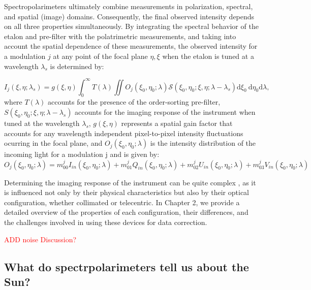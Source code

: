 Spectropolarimeters ultimately combine measurements in polarization, spectral, and spatial (image) domains. Consequently, the final observed intensity depends on all three properties simultaneously. By integrating the spectral behavior of the etalon and pre-filter with the polatrimetric measurements, and taking into account the spatial dependence of these measurements, the observed intensity for a modulation $j$ at any point of the focal plane $\eta, \xi$ when the etalon is tuned at a wavelength $\lambda _ s$ is determined by:

\begin{equation}
  I_ j\left(\xi, \eta ; \lambda_{s}\right)=g(\xi, \eta)\int_{0}^{\infty} T(\lambda) \iint  O _ j\left(\xi_0, \eta_0 ; \lambda\right)  \mathcal{S}\left(\xi_0, \eta_0; \xi , \eta; \lambda-\lambda_{s}\right)  \mathrm{d} \xi_{0} \mathrm{~d} \eta_{0}\mathrm{d} \lambda ,
  \label{eq_spectro: General_Intensity}
\end{equation}
where $T(\lambda)$ accounts for the presence of the order-sorting pre-filter, $S\left(\xi_0, \eta_0; \xi , \eta; \lambda-\lambda_{s}\right)$ accounts for the imaging response of the instrument when tuned at the wavelength $\lambda_{s}$, $g(\xi, \eta)$ represents a spatial gain factor that accounts for any wavelength independent pixel-to-pixel intensity fluctuations ocurring in the focal plane, and $O _ j(\xi_0, \eta_ 0;\lambda)$ is the intensity distribution of the incoming light for a modulation j and is given by:
\begin{equation}
  O _ j(\xi_0, \eta_ 0;\lambda) = m_{00} ^jI_{in}(\xi_0, \eta_ 0;\lambda) + m_{01}^jQ_{in}(\xi_0, \eta_ 0;\lambda) + m_{02}^jU_{in}(\xi_0, \eta_ 0;\lambda) + m_{03}^jV_{in}(\xi_0, \eta_ 0;\lambda)
\end{equation}

Determining the imaging response of the instrument can be quite complex , as it is influenced not only by their physical characteristics but also by their optical configuration, whether collimated or telecentric. In Chapter 2, we provide a detailed overview of the properties of each configuration, their differences, and the challenges involved in using these devices for data correction.

\textcolor{red}{ADD noise Discussion?}
 
\subsection{What do spectrpolarimeters tell us about the Sun?}

